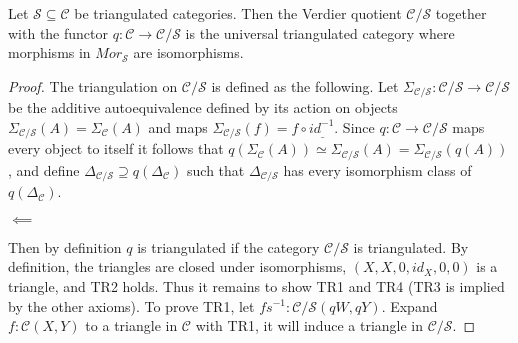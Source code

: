     \begin{theorem}
        Let $\mathcal{S}\subseteq\mathcal{C}$ be triangulated categories. Then the Verdier quotient $\mathcal{C}/\mathcal{S}$ together with the functor $q:\mathcal{C}\rightarrow\mathcal{C}/\mathcal{S}$ is the universal triangulated category where morphisms in $Mor_\mathcal{S}$ are isomorphisms.
    \end{theorem}

    \begin{proof}
        The triangulation on $\mathcal{C}/\mathcal{S}$ is defined as the following. Let $\Sigma_{\mathcal{C/S}}:\mathcal{C}/\mathcal{S}\rightarrow\mathcal{C}/\mathcal{S}$ be the additive autoequivalence defined by its action on objects $\Sigma_{\mathcal{C/S}}(A)=\Sigma_{\mathcal{C}}(A)$ and maps $\Sigma_{\mathcal{C/S}}(f) = f\circ id_{\_}^{-1}$. Since $q:\mathcal{C}\rightarrow\mathcal{C}/\mathcal{S}$ maps every object to itself it follows that $q(\Sigma_{\mathcal{C}}(A)) \simeq \Sigma_{\mathcal{C/S}}(A) = \Sigma_{\mathcal{C/S}}(q(A))$, and define $\Delta_{\mathcal{C}/\mathcal{S}}\supseteq q(\Delta_\mathcal{C})$ such that $\Delta_{\mathcal{C}/\mathcal{S}}$ has every isomorphism class of $q(\Delta_\mathcal{C})$. 
        \begin{center}
            $\impliedby$
        \end{center}
        Then by definition $q$ is triangulated if the category $\mathcal{C}/\mathcal{S}$ is triangulated.
        By definition, the triangles are closed under isomorphisms, $(X,X,0,id_X,0,0)$ is a triangle, and TR2 holds. Thus it remains to show TR1 and TR4 (TR3 is implied by the other axioms). To prove TR1, let $fs^{-1}:\mathcal{C}/\mathcal{S}(qW,qY)$. Expand $f:\mathcal{C}(X,Y)$ to a triangle in $\mathcal{C}$ with TR1, it will induce a triangle in  $\mathcal{C}/\mathcal{S}$.

\end{proof}
